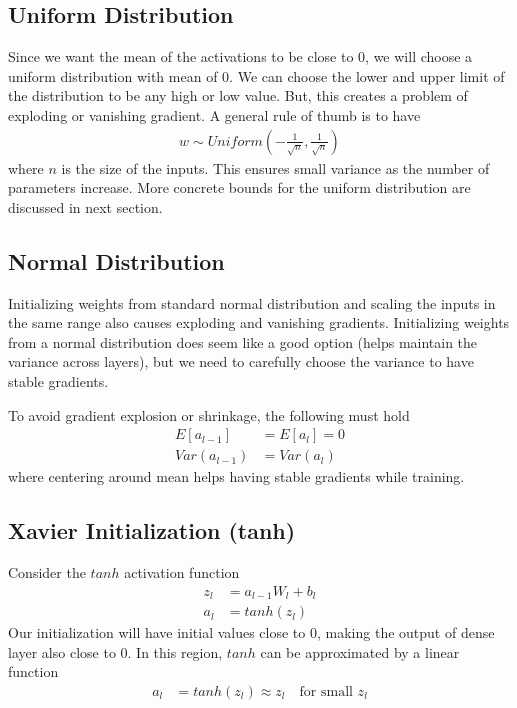 \documentclass[../../deep_learning_notes.tex]{subfiles}
\begin{document}
\subsection{Uniform Distribution}
Since we want the mean of the activations to be close to $0$, we will choose a uniform distribution with mean of $0$. We can choose the lower and upper limit of the distribution to be any high or low value. But, this creates a problem of exploding or vanishing gradient. A general rule of thumb is to have
\begin{align*}
    w \sim Uniform(-\frac{1}{\sqrt{n}}, \frac{1}{\sqrt{n}})
\end{align*}
where $n$ is the size of the inputs. This ensures small variance as the number of parameters increase. More concrete bounds for the uniform distribution are discussed in next section.


\subsection{Normal Distribution}
Initializing weights from standard normal distribution and scaling the inputs in the same range also causes exploding and vanishing gradients. Initializing weights from a normal distribution does seem like a good option (helps maintain the variance across layers), but we need to carefully choose the variance to have stable gradients.\newline

To avoid gradient explosion or shrinkage, the following must hold
\begin{align*}
    E[a_{l-1}] &= E[a_{l}] = 0\\
    Var(a_{l-1}) &= Var(a_{l})
\end{align*}
where centering around mean helps having stable gradients while training.


\subsection{Xavier Initialization (tanh)}
Consider the $tanh$ activation function
\begin{align*}
     z_{l} &= a_{l-1}W_{l} + b_{l}\\
     a_{l} &= tanh(z_{l})
\end{align*}
Our initialization will have initial values close to $0$, making the output of dense layer also close to $0$. In this region, $tanh$ can be approximated by a linear function
\begin{align*}
    a_{l} &= tanh(z_{l}) \approx z_{l} \quad \text{for small $z_{l}$}
\end{align*}
\end{document}
